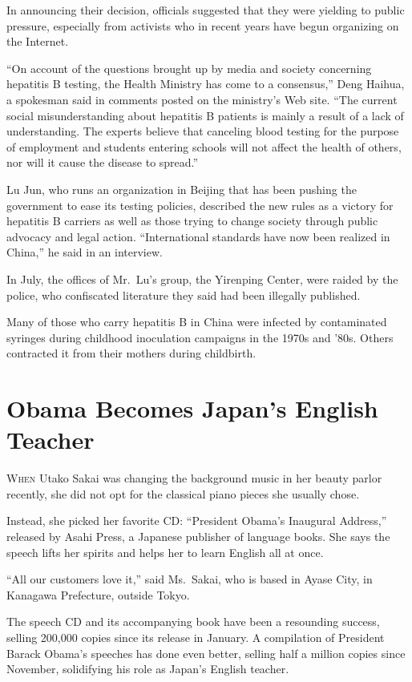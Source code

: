 ﻿\documentclass[12pt]{article}
\begin{document}
In announcing their decision, officials suggested that they were yielding to public pressure,
especially from activists who in recent years have begun organizing on the Internet.

``On account of the questions brought up by media and society concerning hepatitis B testing, the
Health Ministry has come to a consensus,'' Deng Haihua, a spokesman said in comments posted on the
ministry's Web site. ``The current social misunderstanding about hepatitis B patients is mainly a
result of a lack of understanding. The experts believe that canceling blood testing for the purpose
of employment and students entering schools will not affect the health of others, nor will it cause
the disease to spread.''

Lu Jun, who runs an organization in Beijing that has been pushing the government to ease its testing
policies, described the new rules as a victory for hepatitis B carriers as well as those trying to
change society through public advocacy and legal action. ``International standards have now been
realized in China,'' he said in an interview.

In July, the offices of Mr.~Lu's group, the Yirenping Center, were raided by the police, who
confiscated literature they said had been illegally published.

Many of those who carry hepatitis B in China were infected by contaminated syringes during childhood
inoculation campaigns in the 1970s and '80s. Others contracted it from their mothers during
childbirth.

\section{Obama Becomes Japan's English Teacher}

\lettrine{W}{hen} Utako Sakai was changing the background music in her
beauty parlor recently, she did not opt for the classical piano pieces she usually chose.

Instead, she picked her favorite CD: ``President Obama's Inaugural Address,'' released by Asahi
Press, a Japanese publisher of language books. She says the speech lifts her spirits and helps her
to learn English all at once.

``All our customers love it,'' said Ms.~Sakai, who is based in Ayase City, in Kanagawa Prefecture,
outside Tokyo.

The speech CD and its accompanying book have been a resounding success, selling 200,000 copies since
its release in January. A compilation of President Barack Obama's speeches has done even better,
selling half a million copies since November, solidifying his role as Japan's English teacher.
\end{document}
